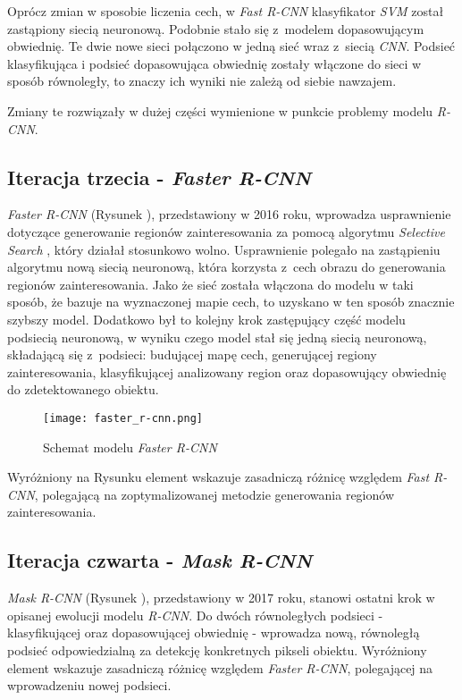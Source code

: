 Oprócz zmian w sposobie liczenia cech, w \textit{Fast R-CNN} klasyfikator \textit{SVM} został zastąpiony siecią neuronową.
Podobnie stało się z~modelem dopasowującym obwiednię.
Te dwie nowe sieci połączono w jedną sieć wraz z~siecią \textit{CNN}.
Podsieć klasyfikująca i podsieć dopasowująca obwiednię zostały włączone do sieci w sposób równoległy, to znaczy ich wyniki nie zależą od siebie nawzajem.

Zmiany te rozwiązały w dużej części wymienione w punkcie  problemy modelu \textit{R-CNN}.

\subsection{Iteracja trzecia - \textit{Faster R-CNN}}

\textit{Faster R-CNN} \cite{faster-rcnn} (Rysunek ), przedstawiony w 2016 roku, wprowadza usprawnienie dotyczące generowanie regionów zainteresowania za pomocą algorytmu \textit{Selective Search} \cite{selective-search}, który działał stosunkowo wolno.
Usprawnienie polegało na zastąpieniu algorytmu nową siecią neuronową, która korzysta z~cech obrazu do generowania regionów zainteresowania.
Jako że sieć została włączona do modelu w taki sposób, że bazuje na wyznaczonej mapie cech, to uzyskano w ten sposób znacznie szybszy model.
Dodatkowo był to kolejny krok zastępujący część modelu podsiecią neuronową, w wyniku czego model stał się jedną siecią neuronową, składającą się z~podsieci: budującej mapę cech, generującej regiony zainteresowania, klasyfikującej analizowany region oraz dopasowujący obwiednię do zdetektowanego obiektu.

\begin{figure}[h]
  \centering
  \texttt{[image: faster\_r-cnn.png]}
  \caption{Schemat modelu \textit{Faster R-CNN}}
  \label{fig:faster_r_cnn}
\end{figure}

Wyróżniony na Rysunku  element wskazuje zasadniczą różnicę względem \textit{Fast R-CNN}, polegającą na zoptymalizowanej metodzie generowania regionów zainteresowania.

\newpage
\subsection{Iteracja czwarta - \textit{Mask R-CNN}}
\label{sec:maskrcnn}
\textit{Mask R-CNN} \cite{matterport-mask-rcnn} (Rysunek ), przedstawiony w 2017 roku, stanowi ostatni krok w opisanej ewolucji modelu \textit{R-CNN}.
Do dwóch równoległych podsieci - klasyfikującej oraz dopasowującej obwiednię - wprowadza nową, równoległą podsieć odpowiedzialną za detekcję konkretnych pikseli obiektu. Wyróżniony element wskazuje zasadniczą różnicę względem \textit{Faster R-CNN}, polegającej na wprowadzeniu nowej podsieci.

